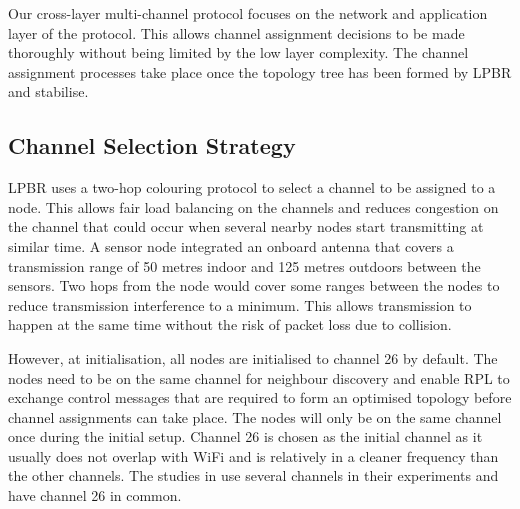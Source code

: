 Our cross-layer multi-channel protocol focuses on the network and application layer of the protocol. This allows channel assignment decisions to be made thoroughly without being limited by the low layer complexity. The channel assignment processes take place once the topology tree has been formed by LPBR and stabilise.



\subsection{Channel Selection Strategy}

LPBR uses a two-hop colouring protocol to select a channel to be assigned to a node. This allows fair load balancing on the channels and reduces congestion on the channel that could occur when several nearby nodes start transmitting at similar time. A sensor node integrated an onboard antenna that covers a transmission range of 50 metres indoor and 125 metres outdoors between the sensors. Two hops from the node would cover some ranges between the nodes to reduce transmission interference to a minimum. This allows transmission to happen at the same time without the risk of packet loss due to collision. 

However, at initialisation, all nodes are initialised to channel 26 by default. The nodes need to be on the same channel for neighbour discovery and enable RPL to exchange control messages that are required to form an optimised topology before channel assignments can take place. The nodes will only be on the same channel once during the initial setup. Channel 26 is chosen as the initial channel as it usually does not overlap with WiFi and is relatively in a cleaner frequency than the other channels. The studies in \cite{chrysso}\cite{micmac}\cite{watteyne} use several channels in their experiments and have channel 26 in common.
	
